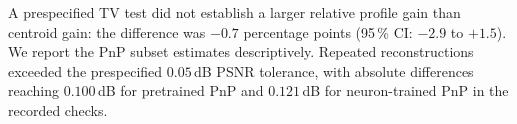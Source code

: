 A prespecified TV test did not establish a larger relative profile gain than centroid gain: the difference was $-0.7$ percentage points (95\,\% CI: $-2.9$ to $+1.5$). We report the PnP subset estimates descriptively. Repeated reconstructions exceeded the prespecified $0.05$\,dB PSNR tolerance, with absolute differences reaching $0.100$\,dB for pretrained PnP and $0.121$\,dB for neuron-trained PnP in the recorded checks.

\begin{table}[t]
\centering\small
\widetab{}
\caption{Axial W1 for reference columns with multiple peaks. We use the 59 eligible crops from the 60-crop comparison at $C=8$, with five measurement draws per crop. Errors and absolute end-to-end-minus-ours differences are in $\mu$m; brackets are paired cell-bootstrap 95\,\% intervals. Feed-forward decoders have the training histories in \cref{sec:s:joint}.}
\label{tab:s:layered}
\end{table}
